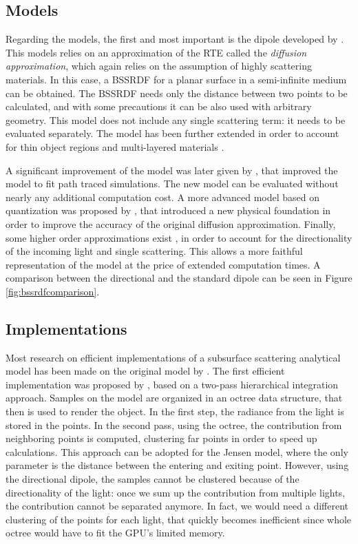 \subsection{Models}
Regarding the models, the first and most important is the dipole developed by \cite{Jensen:2001:PMS:383259.383319}. This models relies on an approximation of the RTE called the \emph{diffusion approximation}, which again relies on the assumption of highly scattering materials. In this case, a BSSRDF for a planar surface in a semi-infinite medium can be obtained. The BSSRDF needs only the distance between two points to be calculated, and with some precautions it can be also used with arbitrary geometry. This model does not include any single scattering term: it needs to be evaluated separately. The model has been further extended in order to account for thin object regions and multi-layered materials \citep{Donner:2005:LDM:1186822.1073308}.

A significant improvement of the model was later given by \cite{deondeon}, that improved the model to fit path traced simulations. The new model can be evaluated without nearly any additional computation cost. A more advanced model based on quantization was proposed by \cite{D'Eon:2011:QMR:1964921.1964951}, that introduced a new physical foundation in order to improve the accuracy of the original diffusion approximation. Finally, some higher order approximations exist \citep{PhysRevLett.94.153904, IMM2013-06646}, in order to account for the directionality of the incoming light and single scattering. This allows a more faithful representation of the model at the price of extended computation times. A comparison between the directional and the standard dipole can be seen in Figure \ref{fig:bssrdfcomparison}.

\subsection{Implementations}

Most research on efficient implementations of a subsurface scattering analytical model has been made on the original model by \cite{Jensen:2001:PMS:383259.383319}. The first efficient implementation was proposed by \cite{Jensen:2002:RHR:566654.566619}, based on a two-pass hierarchical integration approach. Samples on the model are organized in an octree data structure, that then is used to render the object. In the first step, the radiance from the light is stored in the points. In the second pass, using the octree, the contribution from neighboring points is computed, clustering far points in order to speed up calculations. This approach can be adopted for the Jensen model, where the only parameter is the distance between the entering and exiting point. However, using the directional dipole, the samples cannot be clustered because of the directionality of the light: once we sum up the contribution from multiple lights, the contribution cannot be separated anymore. In fact, we would need a different clustering of the points for each light, that quickly becomes inefficient since whole octree would have to fit the GPU's limited memory. 

